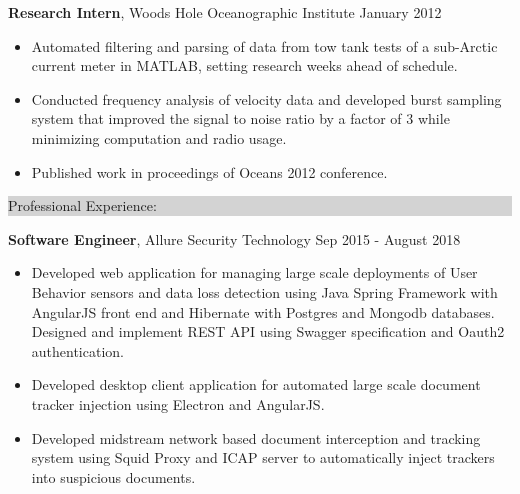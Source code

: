 \documentclass{article} %
\newcommand{\rsection}[1]{
  \hspace{-0.4cm}\vspace{0.1cm}
\colorbox{lightgrey}{
\begin{minipage}{1.07\linewidth}
\vspace{0.22cm}
\fontsize{14pt}{16pt}\selectfont #1
\vspace{0.12cm}
\end{minipage}
}
\vspace*{-0.1cm}
}
\newcommand{\rjob}[2]{
  \hspace*{-0.3cm}
{\fontsize{10pt}{12pt}\selectfont #1} \hfill #2
\vspace*{0.1cm}
\hspace*{-1.2cm}
}
\newenvironment{ritemize}{
\hspace*{-0.8cm}
\begin{minipage}{1.05\linewidth}
\begin{itemize}
}{
\end{itemize}
\end{minipage}
}
\newcommand{\ritem}{
\item[-]
}
\begin{document}

\rjob{\textbf{Research Intern}, Woods Hole Oceanographic Institute}{January 2012}\\
\begin{ritemize}
\ritem Automated filtering and parsing of data from tow tank tests of a sub-Arctic current meter in MATLAB, setting research weeks ahead of schedule.
\ritem Conducted frequency analysis of velocity data and developed burst sampling system that improved the signal to noise ratio by a factor of 3 while minimizing computation and radio usage.
\ritem Published work in proceedings of Oceans 2012 conference.
\end{ritemize}



\pagebreak{}

\rsection{Professional Experience:}

\rjob{\textbf{Software Engineer}, Allure Security Technology}{Sep 2015 - August 2018}\\
\begin{ritemize}
\ritem Developed web application for managing large scale deployments of User Behavior sensors and data loss detection using Java Spring Framework with AngularJS front end and Hibernate with Postgres and Mongodb databases. Designed and implement REST API using Swagger specification and Oauth2 authentication.
\ritem Developed desktop client application for automated large scale document tracker injection using Electron and AngularJS.
\ritem Developed midstream network based document interception and tracking system using Squid Proxy and ICAP server to automatically inject trackers into suspicious documents.
\end{ritemize}
\end{document}
